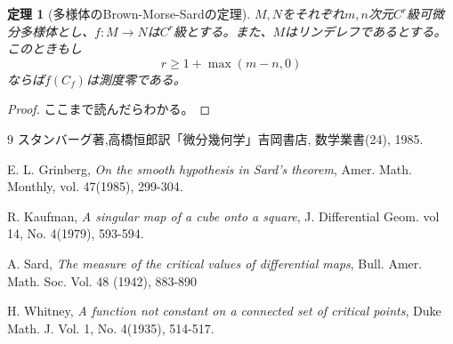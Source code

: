 \documentclass[leqno]{jsarticle}
\newtheorem{thm}{定理}
\begin{document}
\begin{thm}[多様体のBrown-Morse-Sardの定理]
$M,N$をそれぞれ$m,n$次元$C^r$級可微分多様体とし、$f:M\to N$は$C^r$級とする。また、$M$はリンデレフであるとする。このときもし
\[
r\ge 1+ \max({m-n, 0})
\]
ならば$f(C_f)$は測度零である。
\end{thm}
\begin{proof}
ここまで読んだらわかる。
\end{proof}


	
\begin{thebibliography}{9}
スタンバーグ著,高橋恒郎訳「微分幾何学」吉岡書店, 数学業書(24), 1985.

 E. L. Grinberg, \textit{On the smooth hypothesis in Sard's theorem}, Amer. Math. Monthly, vol. 47(1985), 299-304.


 R. Kaufman, \textit{A singular map of a cube onto a square}, J. Differential Geom. vol 14, No. 4(1979), 593-594.

 A. Sard, \textit{The measure of the critical values of differential maps}, 
Bull. Amer. Math. Soc. Vol. 48 (1942), 883-890 

 H. Whitney, \textit{A function not constant on a connected set of critical points}, Duke Math. J. Vol. 1, No. 4(1935), 514-517.

\end{thebibliography}




			
\end{document}
